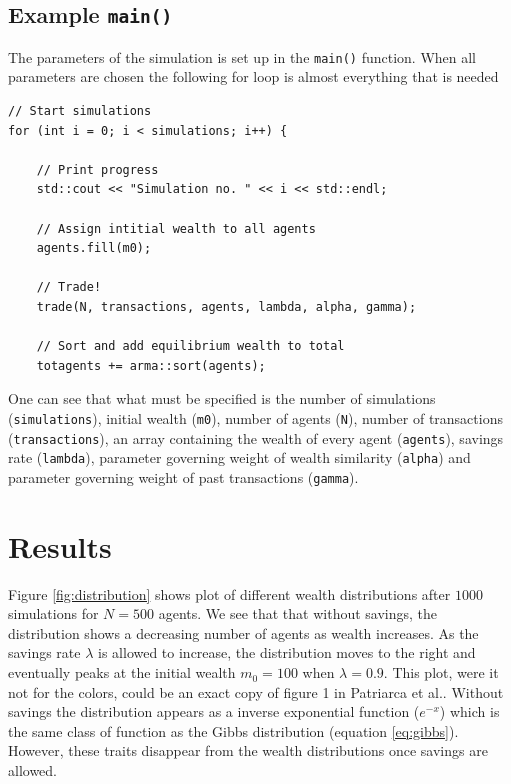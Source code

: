\documentclass[10pt, a4paper]{amsart}
\begin{document}
\subsection{Example \lstinline|main()|}
The parameters of the simulation is set up in the \lstinline|main()| function. When all parameters are chosen the following for loop is almost everything that is needed
\begin{lstlisting}
// Start simulations
for (int i = 0; i < simulations; i++) {

	// Print progress
	std::cout << "Simulation no. " << i << std::endl;

	// Assign intitial wealth to all agents
	agents.fill(m0);

	// Trade!
	trade(N, transactions, agents, lambda, alpha, gamma);

	// Sort and add equilibrium wealth to total
	totagents += arma::sort(agents);
\end{lstlisting}
One can see that what must be specified is the number of simulations (\lstinline|simulations|), initial wealth (\lstinline|m0|), number of agents (\lstinline|N|), number of transactions (\lstinline|transactions|), an array containing the wealth of every agent (\lstinline|agents|), savings rate (\lstinline|lambda|), parameter governing weight of wealth similarity (\lstinline|alpha|) and parameter governing weight of past transactions (\lstinline|gamma|).


\section{Results}


Figure \ref{fig:distribution} shows plot of different wealth distributions after $1000$ simulations for $N=500$ agents. We see that that without savings, the distribution shows a decreasing number of agents as wealth increases. As the savings rate $\lambda$ is allowed to increase, the distribution moves to the right and eventually peaks at the initial wealth $m_0 = 100$ when $\lambda = 0.9$. This plot, were it not for the colors, could be an exact copy of figure 1 in Patriarca et al.\cite{Patriarca}. Without savings the distribution appears as a inverse exponential function ($e^{-x}$) which is the same class of function as the Gibbs distribution (equation \ref{eq:gibbs}). However, these traits disappear from the wealth distributions once savings are allowed.
\end{document}
